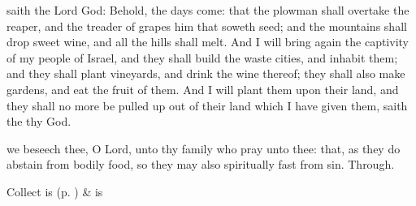  saith the Lord God: Behold, the days come: that the plowman shall overtake the reaper, and the treader of grapes him that soweth seed; and the mountains shall drop sweet wine, and all the hills shall melt. And I will bring again the captivity of my people of Israel, and they shall build the waste cities, and inhabit them; and they shall plant vineyards, and drink the wine thereof; they shall also make gardens, and eat the fruit of them. And I will plant them upon their land, and they shall no more be pulled up out of their land which I have given them, saith the  thy God.
\\


\collect
{} we beseech thee, O Lord, unto thy family who pray unto thee: that, as they do abstain from bodily food, so they may also spiritually fast from sin. Through.
\begin{rubric}
     Collect is  (p. \pageref{SPSaints}) \&  is 
\end{rubric}

